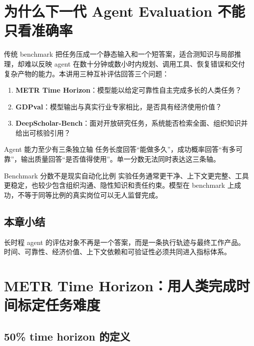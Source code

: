 \documentclass[a4paper]{article}
\begin{document}
\makelecturetitle

\section{为什么下一代 Agent Evaluation 不能只看准确率}

传统 benchmark 把任务压成一个静态输入和一个短答案，适合测知识与局部推理，却难以反映 agent 在数十分钟或数小时内规划、调用工具、恢复错误和交付复杂产物的能力。本讲用三种互补评估回答三个问题：

\begin{enumerate}
    \item \textbf{METR Time Horizon}：模型能以给定可靠性自主完成多长的人类任务？
    \item \textbf{GDPval}：模型输出与真实行业专家相比，是否具有经济使用价值？
    \item \textbf{DeepScholar-Bench}：面对开放研究任务，系统能否检索全面、组织知识并给出可核验引用？
\end{enumerate}


\begin{importantbox}{Agent 能力至少有三条独立轴}
任务长度回答“能做多久”，成功概率回答“有多可靠”，输出质量回答“是否值得使用”。单一分数无法同时表达这三条轴。
\end{importantbox}

\begin{warningbox}{Benchmark 分数不是现实自动化比例}
实验任务通常更干净、上下文更完整、工具更稳定，也较少包含组织沟通、隐性知识和责任约束。模型在 benchmark 上成功，不等于同等比例的真实岗位可以无人监督完成。
\end{warningbox}

\subsection{本章小结}

长时程 agent 的评估对象不再是一个答案，而是一条执行轨迹与最终工作产品。时间、可靠性、经济价值、上下文依赖和可验证性必须共同进入指标体系。

\section{METR Time Horizon：用人类完成时间标定任务难度}

\subsection{50\% time horizon 的定义}
\end{document}

